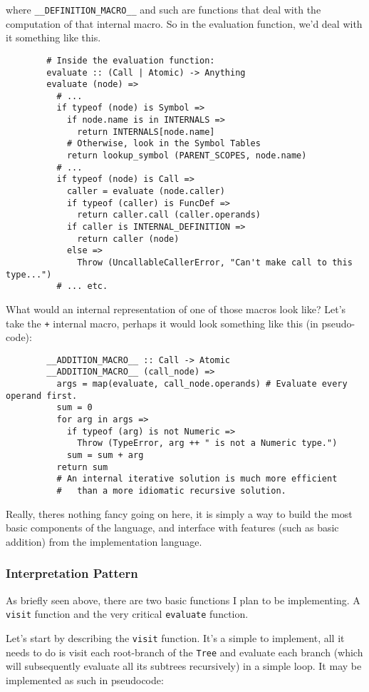 \documentclass{article}
\newcommand{\code}[1]{\texttt{#1}}
\begin{document}
      where \code{\_\_DEFINITION\_MACRO\_\_} and such are functions that deal with
      the computation of that internal macro. So in the evaluation function,
      we'd deal with it something like this.
      \begin{verbatim}
        # Inside the evaluation function:
        evaluate :: (Call | Atomic) -> Anything
        evaluate (node) =>
          # ...
          if typeof (node) is Symbol =>
            if node.name is in INTERNALS =>
              return INTERNALS[node.name]
            # Otherwise, look in the Symbol Tables
            return lookup_symbol (PARENT_SCOPES, node.name)
          # ...
          if typeof (node) is Call =>
            caller = evaluate (node.caller)
            if typeof (caller) is FuncDef =>
              return caller.call (caller.operands)
            if caller is INTERNAL_DEFINITION =>
              return caller (node)
            else =>
              Throw (UncallableCallerError, "Can't make call to this type...")
          # ... etc.
      \end{verbatim}
      \clearpage
      What would an internal representation of one of those macros look like?
      Let's take the \code{+} internal macro, perhaps it would look something
      like this (in pseudo-code):
      \begin{verbatim}
        __ADDITION_MACRO__ :: Call -> Atomic
        __ADDITION_MACRO__ (call_node) =>
          args = map(evaluate, call_node.operands) # Evaluate every operand first.
          sum = 0
          for arg in args =>
            if typeof (arg) is not Numeric =>
              Throw (TypeError, arg ++ " is not a Numeric type.")
            sum = sum + arg
          return sum
          # An internal iterative solution is much more efficient
          #   than a more idiomatic recursive solution.
      \end{verbatim}
      Really, theres nothing fancy going on here, it is simply a way to build
      the most basic components of the language, and interface with features
      (such as basic addition) from the implementation language.
    \subsubsection{Interpretation Pattern}
      As briefly seen above, there are two basic functions I plan to be
      implementing.  A \code{visit} function and the very critical \code{evaluate}
      function.

      Let's start by describing the \code{visit} function. It's a simple to
      implement, all it needs to do is visit each root-branch of the \code{Tree}
      and evaluate each branch (which will subsequently evaluate all its
      subtrees recursively) in a simple loop. It may be implemented as such
      in pseudocode:
\end{document}

